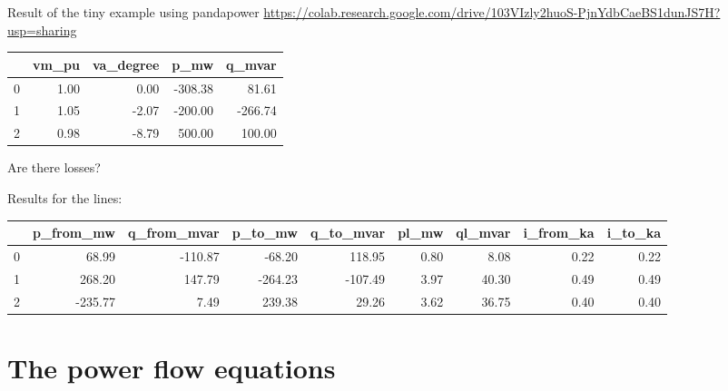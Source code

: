 \begin{frame}[allowframebreaks]{Result of the tiny example using pandapower}
    \url{https://colab.research.google.com/drive/103VIzly2huoS-PjnYdbCaeBS1dunJS7H?usp=sharing}
    \begin{tabular}{|l|r|r|r|r|}
        \hline
        & \textbf{vm\_pu} & \textbf{va\_degree} & \textbf{p\_mw} & \textbf{q\_mvar} \\
        \hline
        0 & 1.00 & 0.00 & -308.38 & 81.61 \\
        \hline
        1 & 1.05 & -2.07 & -200.00 & -266.74 \\
        \hline
        2 & 0.98 & -8.79 & 500.00 & 100.00 \\
        \hline
    \end{tabular}
   
    
    Are there losses?
    
    \vfill
    \begin{block}{Results for the lines:}
        \begin{tabular}{|l|r|r|r|r|r|r|r|r|}
            \hline
            & \textbf{p\_from\_mw} & \textbf{q\_from\_mvar} & \textbf{p\_to\_mw} & \textbf{q\_to\_mvar} & \textbf{pl\_mw} & \textbf{ql\_mvar} & \textbf{i\_from\_ka} & \textbf{i\_to\_ka} \\
            \hline
            0 & 68.99 & -110.87 & -68.20 & 118.95 & 0.80 & 8.08 & 0.22 & 0.22 \\
            \hline
            1 & 268.20 & 147.79 & -264.23 & -107.49 & 3.97 & 40.30 & 0.49 & 0.49 \\
            \hline
            2 & -235.77 & 7.49 & 239.38 & 29.26 & 3.62 & 36.75 & 0.40 & 0.40 \\
            \hline
        \end{tabular}
    \end{block}
   
\end{frame}

\section{The power flow equations}

